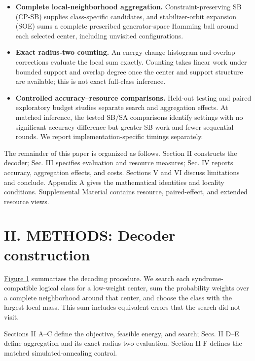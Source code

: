 \documentclass[
  10pt,
]{article}
\providecommand{\tightlist}{%
  \setlength{\itemsep}{0pt}\setlength{\parskip}{0pt}}
\begin{document}
\begin{itemize}
\tightlist
\item
  \textbf{Complete local-neighborhood aggregation.}
  Constraint-preserving SB (CP-SB) supplies class-specific candidates,
  and stabilizer-orbit expansion (SOE) sums a complete prescribed
  generator-space Hamming ball around each selected center, including
  unvisited configurations.
\item
  \textbf{Exact radius-two counting.} An energy-change histogram and
  overlap corrections evaluate the local sum exactly. Counting takes
  linear work under bounded support and overlap degree once the center
  and support structure are available; this is not exact full-class
  inference.
\item
  \textbf{Controlled accuracy--resource comparisons.} Held-out testing
  and paired exploratory budget studies separate search and aggregation
  effects. At matched inference, the tested SB/SA comparisons identify
  settings with no significant accuracy difference but greater SB work
  and fewer sequential rounds. We report implementation-specific timings
  separately.
\end{itemize}

The remainder of this paper is organized as follows. Section II
constructs the decoder; Sec. III specifies evaluation and resource
measures; Sec. IV reports accuracy, aggregation effects, and costs.
Sections V and VI discuss limitations and conclude. Appendix A gives the
mathematical identities and locality conditions. Supplemental Material
contains resource, paired-effect, and extended resource views.

\section{II. METHODS: Decoder
construction}\label{ii.-methods-decoder-construction}

\hyperref[fig:1]{Figure 1} summarizes the decoding procedure. We search each
syndrome-compatible logical class for a low-weight center, sum the
probability weights over a complete neighborhood around that center, and
choose the class with the largest local mass. This sum includes
equivalent errors that the search did not visit.

Sections II A--C define the objective, feasible energy, and search;
Secs. II D--E define aggregation and its exact radius-two evaluation.
Section II F defines the matched simulated-annealing control.
\end{document}
